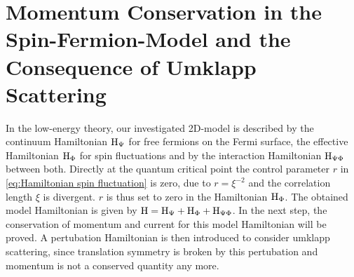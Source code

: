 \section{Momentum Conservation in the Spin-Fermion-Model and the Consequence of Umklapp Scattering}
\label{sec:umklapp scattering}
%
%
In the low-energy theory, our investigated 2D-model is described by the continuum Hamiltonian $\mathrm{H}_{\Psi}$ for free fermions on the Fermi surface, the effective Hamiltonian $\mathrm{H}_{\Phi}$ for spin fluctuations and by the interaction Hamiltonian $\mathrm{H}_{\Psi\Phi}$ between both.
Directly at the quantum critical point the control parameter $r$ in \eqref{eq:Hamiltonian spin fluctuation} is zero, due to $r = \xi^{-2}$ and the correlation length $\xi$ is divergent.
$r$ is thus set to zero in the Hamiltonian $\mathrm{H}_{\Phi}$.
The obtained model Hamiltonian is given by $\mathrm{H} = \mathrm{H}_{\Psi} + \mathrm{H}_{\Phi} + \mathrm{H}_{\Psi\Phi}$.
In the next step, the conservation of momentum and current for this model Hamiltonian will be proved.
A pertubation Hamiltonian is then introduced to consider umklapp scattering, since translation symmetry is broken by this pertubation and momentum is not a conserved quantity any more.

